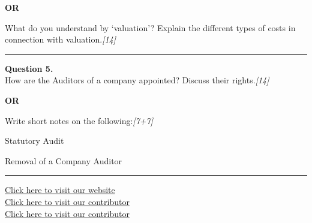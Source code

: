 \documentclass[11pt,a4paper]{article}
\newcommand{\pts}[1]{\hfill   \textit{[#1]}}
\begin{document}
\centerline{   \textbf{OR}}

What do you understand by `valuation'? Explain the different types of costs in connection with valuation.\pts{14}

\medskip\rule{\linewidth}{0.2pt}




\noindent   \textbf{Question 5.} \\
How are the Auditors of a company appointed? Discuss their rights.\pts{14}

\centerline{   \textbf{OR}}

Write short notes on the following:\pts{7+7}

\begin{parts}
  \item Statutory Audit
  \item Removal of a Company Auditor
\end{parts}

\vfill
\rule{\linewidth}{0.4pt}

\begin{center}\small
  \href{https://bhu-exam.vercel.app/}{Click here to visit our website}\\[4pt]
  \href{https://me-aryan.vercel.app/}{Click here to visit our contributor}\\[4pt]
  \href{https://quashan-me.vercel.app/}{Click here to visit our contributor}
\end{center}
\end{document}
